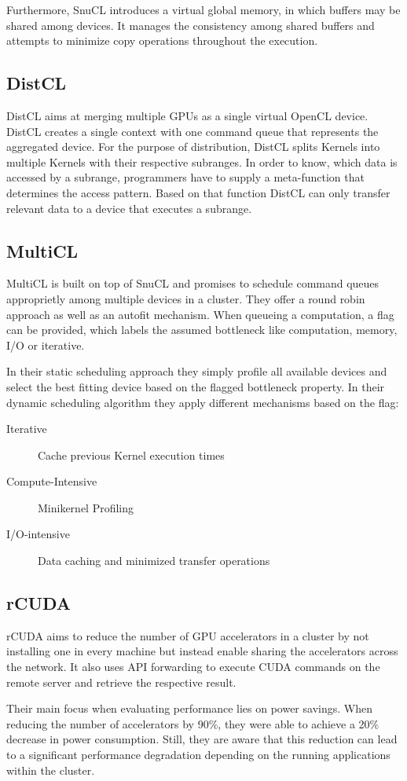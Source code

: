 Furthermore, SnuCL introduces a virtual global memory, in which buffers may be shared among devices. It manages the consistency among shared buffers and attempts to minimize copy operations throughout the execution.

\subsection*{DistCL\cite{distcl}}
DistCL aims at merging multiple GPUs as a single virtual OpenCL device. DistCL creates a single context with one command queue that represents the aggregated device. For the purpose of distribution, DistCL splits Kernels into multiple Kernels with their respective subranges. In order to know, which data is accessed by a subrange, programmers have to supply a meta-function that determines the access pattern. Based on that function DistCL can only transfer relevant data to a device that executes a subrange.

\subsection*{MultiCL\cite{multicl}}

MultiCL is built on top of SnuCL and promises to schedule command queues approprietly among multiple devices in a cluster. They offer a round robin approach as well as an autofit mechanism. When queueing a computation, a flag can be provided, which labels the assumed bottleneck like computation, memory, I/O or iterative.

In their static scheduling approach they simply profile all available devices and select the best fitting device based on the flagged bottleneck property. In their dynamic scheduling algorithm they apply different mechanisms based on the flag:

\begin{description}
\item [Iterative] Cache previous Kernel execution times
\item [Compute-Intensive] Minikernel Profiling
\item [I/O-intensive] Data caching and minimized transfer operations
\end{description}

\subsection*{rCUDA\cite{rcuda}}

rCUDA aims to reduce the number of GPU accelerators in a cluster by not installing one in every machine but instead enable sharing the accelerators across the network. It also uses API forwarding to execute CUDA commands on the remote server and retrieve the respective result.

Their main focus when evaluating performance lies on power savings. When reducing the number of accelerators by 90\%, they were able to achieve a 20\% decrease in power consumption. Still, they are aware that this reduction can lead to a significant performance degradation depending on the running applications within the cluster.
